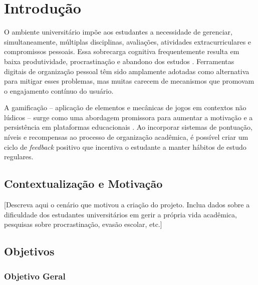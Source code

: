 
\chapter{Introdução}
\label{cap:introducao}

O ambiente universitário impõe aos estudantes a necessidade de gerenciar,
simultaneamente, múltiplas disciplinas, avaliações, atividades extracurriculares e
compromissos pessoais. Essa sobrecarga cognitiva frequentemente resulta em baixa
produtividade, procrastinação e abandono dos estudos \cite{[REFERENCIA_1]}.
Ferramentas digitais de organização pessoal têm sido amplamente adotadas como
alternativa para mitigar esses problemas, mas muitas carecem de mecanismos que
promovam o engajamento contínuo do usuário.

A gamificação -- aplicação de elementos e mecânicas de jogos em contextos não
lúdicos -- surge como uma abordagem promissora para aumentar a motivação e a
persistência em plataformas educacionais \cite{[REFERENCIA_2]}. Ao incorporar
sistemas de pontuação, níveis e recompensas ao processo de organização acadêmica,
é possível criar um ciclo de \textit{feedback} positivo que incentiva o estudante
a manter hábitos de estudo regulares.

\section{Contextualização e Motivação}
\label{sec:contextualizacao}

[Descreva aqui o cenário que motivou a criação do projeto. Inclua dados sobre
a dificuldade dos estudantes universitários em gerir a própria vida acadêmica,
pesquisas sobre procrastinação, evasão escolar, etc.]

\section{Objetivos}
\label{sec:objetivos}

\subsection{Objetivo Geral}
\label{subsec:objetivo-geral}

